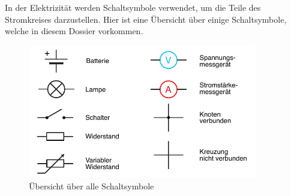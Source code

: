 In der Elektrizität werden Schaltsymbole verwendet, um die Teile des
Stromkreises darzustellen. Hier ist eine Übersicht über einige Schaltsymbole,
welche in diesem Dossier vorkommen.

\begin{figure}[h!]
    \centering
    \includegraphics[width=10cm]{_images/schaltsymbole.pdf}
    \caption{Übersicht über alle Schaltsymbole}
    \label{fig:symbols}
\end{figure}

